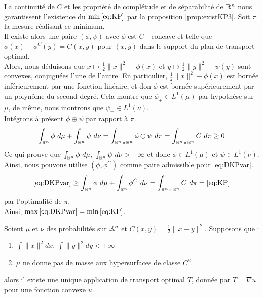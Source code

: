 \documentclass[a4paper,12pt]{article}
\begin{document}
\begin{preuve}
La continuité de $C$ et les propriété de complétude et de séparabilité de $\mathbb{R}^n$ nous garantissent l'existence du $\min\eqref{eq:KP}$ par la proposition \eqref{prop:existKP3}. Soit $\pi$ la mesure réalisant ce minimum. \\

Il existe alors une paire $(\phi,\psi)$ avec $\phi$ est $C$ - concave et telle que $\phi(x)+\phi^C(y) = C(x,y)$ pour $(x,y)$ dans le support du plan de transport optimal.\\

Alors, nous déduisons que $x\mapsto\frac{1}{2}\|x\|^2-\phi(x)$ et $y\mapsto\frac{1}{2}\|y\|^2-\psi(y)$ sont convexes, conjuguées l'une de l'autre. En particulier, $\frac{1}{2}\|x\|^2-\phi(x)$ est bornée inférieurement par une fonction linéaire, et don $\phi$ est bornée supérieurement par un polynôme du second degré. Cela montre que $\phi_+\in L^1(\mu)$ par hypothèse sur $\mu$, de même, nous montrons que $\psi_+\in L^1(\nu)$. \\
Intégrons à présent $\phi\oplus\psi$ par rapport à $\pi$. 
$$
\int_{\RR^n}\phi\ d\mu + \int_{\RR^n}\psi\ d\nu = \int_{\RR^n\times\RR^n}\phi\oplus\psi\ d\pi = \int_{\RR^n\times\RR^n}C\ d\pi \geq 0
$$
Ce qui prouve que $\int_{\mathbb{R}^n}\phi\ d\mu,\ \int_{\mathbb{R}^n}\psi\ d\nu > -\infty$ et donc $\phi\in L^1(\mu)$ et $\psi \in L^1(\nu)$.\\

Ainsi, nous pouvons utilise $(\phi,\phi^C)$ comme paire admissible pour \eqref{eq:DKPvar}. 
$$
\eqref{eq:DKPvar} \geq \int_{\RR^n}\phi\ d\mu + \int_{\RR^n}\phi^C\ d\nu = \int_{\RR^n\times\RR^n}C\ d\pi = \eqref{eq:KP}
$$
par l'optimalité de $\pi$. \\
Ainsi, $\max\eqref{eq:DKPvar} = \min\eqref{eq:KP}$. 
\end{preuve}


\begin{theoreme}{}
Soient $\mu$ et $\nu$ des probabilités sur $\mathbb{R}^n$ et $C(x,y)=\frac{1}{2}\|x-y\|^2$. Supposons que : 
\begin{enumerate}
\item $\int\|x\|^2dx$, $\int\|y\|^2dy<+\infty$
\item $\mu$ ne donne pas de masse aux hypersurfaces de classe $C^2$.
\end{enumerate}
alors il existe une unique application de transport optimal $T$, donnée par $T=\nabla u$ pour une fonction convexe $u$.
\end{theoreme}
\end{document}
